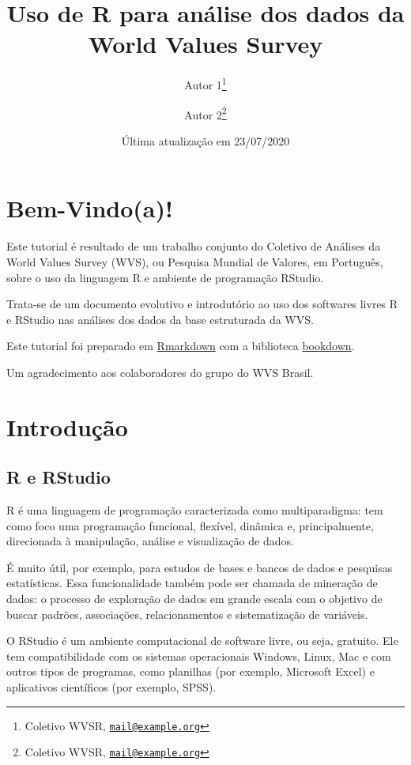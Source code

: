 \documentclass[
  10pt,
  brazil,
  a4paper,
  twoside, notitlepage, openright]{book}
\title{Uso de R para análise dos dados da World Values Survey}
\author{Autor 1\footnote{Coletivo WVSR, \href{mailto:mail@example.org}{\nolinkurl{mail@example.org}}} \and Autor 2\footnote{Coletivo WVSR, \href{mailto:mail@example.org}{\nolinkurl{mail@example.org}}}}
\date{Última atualização em 23/07/2020}
\begin{document}
\maketitle

{
\setcounter{tocdepth}{1}
\tableofcontents
}
\hypertarget{bem-vindoa}{%
\chapter*{Bem-Vindo(a)!}\label{bem-vindoa}}

Este tutorial é resultado de um trabalho conjunto do Coletivo de Análises da World Values Survey (WVS), ou Pesquisa Mundial de Valores, em Português, sobre o uso da linguagem R e ambiente de programação RStudio.

Trata-se de um documento evolutivo e introdutório ao uso dos softwares livres R e RStudio nas análises dos dados da base estruturada da WVS.

Este tutorial foi preparado em \href{https://rmarkdown.rstudio.com/}{Rmarkdown} com a biblioteca \href{https://bookdown.org/}{bookdown}.

Um agradecimento aos colaboradores do grupo do WVS Brasil.

\hypertarget{intro}{%
\chapter{Introdução}\label{intro}}

\hypertarget{r-e-rstudio}{%
\section{R e RStudio}\label{r-e-rstudio}}

R é uma linguagem de programação caracterizada como multiparadigma: tem como foco uma programação funcional, flexível, dinâmica e, principalmente, direcionada à manipulação, análise e visualização de dados.

É muito útil, por exemplo, para estudos de bases e bancos de dados e pesquisas estatísticas. Essa funcionalidade também pode ser chamada de mineração de dados: o processo de exploração de dados em grande escala com o objetivo de buscar padrões, associações, relacionamentos e sistematização de variáveis.

O RStudio é um ambiente computacional de software livre, ou seja, gratuito. Ele tem compatibilidade com os sistemas operacionais Windows, Linux, Mac e com outros tipos de programas, como planilhas (por exemplo, Microsoft Excel) e aplicativos científicos (por exemplo, SPSS).
\end{document}
